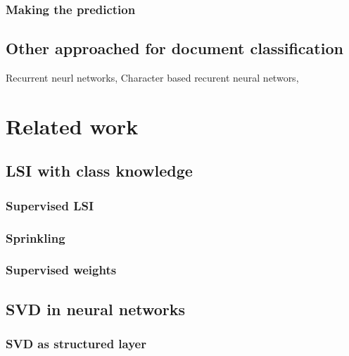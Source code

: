         \subsection{Making the prediction}
            \* %
    
    \section{Other approached for document classification}
        Recurrent neurl networks,
        Character based recurent neural networs, 

\* %

\chapter{Related work}
    \section{LSI with class knowledge}
        \subsection{Supervised LSI}
            \cite{sun2004supervised} %

        \subsection{Sprinkling}
            \cite{chakraborti2007supervised} %
        
        \subsection{Supervised weights}
            \cite{wu2017balancing} %
            \cite{ji2013discriminative} %
            \cite{deng2014study} %
            \cite{lan2009supervised} %

    
    \section{SVD in neural networks}
        \subsection{SVD as structured layer} 
            \cite{ionescu2015training} %

